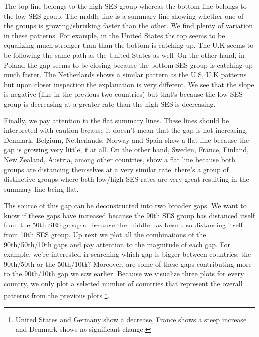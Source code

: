 \documentclass[11pt, a4paper]{article}\usepackage[]{graphicx}\usepackage[]{color}
\begin{document}
The top line belongs to the high SES group whereas the bottom line belongs to the low SES group. The middle line is a summary line showing whether one of the groups is growing/shrinking faster than the other. We find plenty of variation in these patterns. For example, in the United States the top seems to be equalizing much stronger than than the bottom is catching up. The U.K seems to be following the same path as the United States as well. On the other hand, in Poland the gap seems to be closing because the bottom SES group is catching up much faster. The Netherlands shows a similar pattern as the U.S, U.K patterns but upon closer inspection the explanation is very different. We see that the slope is negative (like in the previous two countries) but that's because the low SES group is decreasing at a greater rate than the high SES is decreasing.

Finally, we pay attention to the flat summary lines. These lines should be interpreted with caution because it doesn't mean that the gap is not increasing. Denmark, Belgium, Netherlands, Norway and Spain show a flat line because the gap is growing very little, if at all. On the other hand, Sweden, France, Finland, New Zealand, Austria, among other countries, show a flat line because both groups are distancing themselves at a very similar rate. there's a group of distinctive groups where both low/high SES rates are very great resulting in the summary line being flat.

Ths source of this gap can be deconstructed into two broader gaps. We want to know if these gaps have increased because the 90th SES group has distanced itself from the 50th SES group or because the middle has been also distancing itself from 10th SES group. Up next we plot all the combinations of the 90th/50th/10th gaps and pay attention to the magnitude of each gap. For example, we're interested in searching which gap is bigger between countries, the 90th/50th or the 50th/10th? Moreover, are some of these gaps contributing more to the 90th/10th gap we saw earlier. Because we visualize three plots for every country, we only plot a selected number of countries that represent the overall patterns from the previous plots \footnote{United States and Germany show a decrease, France shows a steep increase and Denmark shows no significant change.}.
\end{document}

